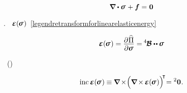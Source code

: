 
\nopagebreak\en{\vspace{-0.125em}}\ru{\vspace{-0.6em}}
\begin{equation}\label{stresseseq:balanceofforces}
\boldnabla \dotp \linearstress \hspace{.15ex} + \bm{f} = \hspace{.1ex} \bm{0}
\end{equation}

\nopagebreak\vspace{-0.2em}\noindent
{} .
\ru{,} ~${\infinitesimaldeformation(\hspace{-0.15ex}\linearstress\hspace{.1ex})}$~\eqref{legendretransformforlinearelasticenergy}

\nopagebreak\vspace{-0.2em}\begin{equation}\label{stresseseq:strainfromstress}
\infinitesimaldeformation(\hspace{-0.15ex}\linearstress\hspace{.1ex}) = \displaystyle\frac{\raisemath{-0.2em}{\partial\hspace{.1ex} \widehat{\potential}}}{\raisemath{.04em}{\partial \linearstress}} = \hspace{-0.12ex} \pliabilitytensor \dotdotp \hspace{-0.07ex} \linearstress
\end{equation}

\nopagebreak\vspace{-0.5em}\noindent
{}~()

\nopagebreak\vspace{-0.5em}\begin{equation}\label{stresseseq:compatibility}
\operatorname{inc} \infinitesimaldeformation(\hspace{-0.15ex}\linearstress\hspace{.1ex}) \hspace{-0.06ex}
\equiv
\hspace{-0.07ex} \boldnabla \hspace{-0.2ex} \times \hspace{-0.44ex} \Bigl( \boldnabla \hspace{-0.2ex} \times \hspace{-0.16ex} \infinitesimaldeformation(\hspace{-0.15ex}\linearstress\hspace{.1ex}) \Bigr)^{\raisemath{-0.12em}{\hspace{-0.44ex}\T}} \hspace{-0.52ex}
= {^2\bm{0}}
\hspace{.1ex} .
\end{equation}

